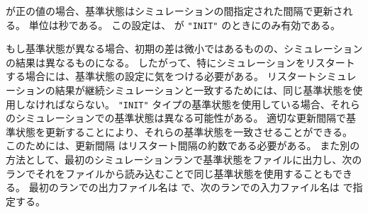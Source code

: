 が正の値の場合、基準状態はシミュレーションの間指定された間隔で更新される。
単位は秒である。
この設定は、 が \verb|"INIT"| のときにのみ有効である。


もし基準状態が異なる場合、初期の差は微小ではあるものの、シミュレーションの結果は異なるものになる。
したがって、特にシミュレーションをリスタートする場合には、基準状態の設定に気をつける必要がある。
リスタートシミュレーションの結果が継続シミュレーションと一致するためには、同じ基準状態を使用しなければならない。
\verb|"INIT"| タイプの基準状態を使用している場合、それらのシミュレーションでの基準状態は異なる可能性がある。
適切な更新間隔で基準状態を更新することにより、それらの基準状態を一致させることができる。
このためには、更新間隔  はリスタート間隔の約数である必要がある。
また別の方法として、最初のシミュレーションランで基準状態をファイルに出力し、次のランでそれをファイルから読み込むことで同じ基準状態を使用することもできる。
最初のランでの出力ファイル名は  で、次のランでの入力ファイル名は  で指定する。
